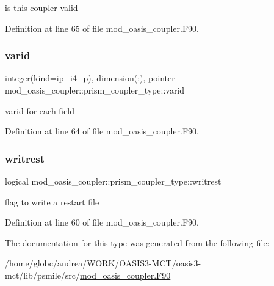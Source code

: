 is this coupler valid 



Definition at line 65 of file mod\+\_\+oasis\+\_\+coupler.\+F90.

\mbox{\label{structmod__oasis__coupler_1_1prism__coupler__type_a9e31592685ea4cb2da222187ee2ffa4b}} 
\subsubsection{\texorpdfstring{varid}{varid}}
{\footnotesize\ttfamily integer(kind=ip\+\_\+i4\+\_\+p), dimension(\+:), pointer mod\+\_\+oasis\+\_\+coupler\+::prism\+\_\+coupler\+\_\+type\+::varid\hspace{0.3cm}{\ttfamily [private]}}



varid for each field 



Definition at line 64 of file mod\+\_\+oasis\+\_\+coupler.\+F90.

\mbox{\label{structmod__oasis__coupler_1_1prism__coupler__type_ac6ed82fd00e0244b23fa874d62a83c9d}} 
\subsubsection{\texorpdfstring{writrest}{writrest}}
{\footnotesize\ttfamily logical mod\+\_\+oasis\+\_\+coupler\+::prism\+\_\+coupler\+\_\+type\+::writrest\hspace{0.3cm}{\ttfamily [private]}}



flag to write a restart file 



Definition at line 60 of file mod\+\_\+oasis\+\_\+coupler.\+F90.



The documentation for this type was generated from the following file\+:\begin{DoxyCompactItemize}
\item 
/home/globc/andrea/\+W\+O\+R\+K/\+O\+A\+S\+I\+S3-\/\+M\+C\+T/oasis3-\/mct/lib/psmile/src/\hyperlink{mod__oasis__coupler_8_f90}{mod\+\_\+oasis\+\_\+coupler.\+F90}\end{DoxyCompactItemize}
